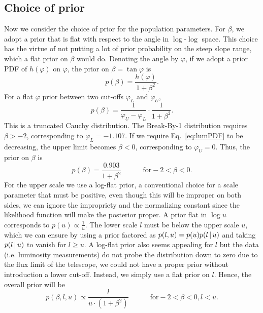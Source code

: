 \subsection{Choice of prior}

Now we consider the choice of prior for the population parameters.
For $\beta$, we adopt a prior that is flat with respect to the angle in $\log$-$\log$ space.
This choice has the virtue of not putting a lot of prior probability on the steep slope range, which a flat prior on $\beta$ would do.
Denoting the angle by $\varphi$, if we adopt a prior PDF of $h(\varphi)$ on $\varphi$, the prior on $\beta = \tan\varphi$ is
\begin{equation}
	p(\beta) = \frac{h(\varphi)}{1 + \beta^2}.
\end{equation}
For a flat $\varphi$ prior between two cut-offs $\varphi_L$ and $\varphi_U$,
\begin{equation}
	p(\beta) = \frac{1}{\varphi_U - \varphi_L} \cdot \frac{1}{1 + \beta^2}.
\end{equation}
This is a truncated Cauchy distribution.
The Break-By-1 distribution requires $\beta > -2$, corresponding to $\varphi_L = -1.107$.
If we require Eq.~\ref{eq:lumPDF} to be decreasing, the upper limit becomes $\beta < 0$, corresponding to $\varphi_U = 0$.
Thus, the prior on $\beta$ is
\begin{equation}
p(\beta) = \frac{0.903}{1 + \beta^2} \quad \quad \quad \textrm{for} -2 < \beta < 0.
\end{equation}
For the upper scale we use a log-flat prior, a conventional choice for a scale parameter that must be positive, even though this will be improper on both sides, we can ignore the impropriety and the normalizing constant since the likelihood function will make the posterior proper.
A prior flat in $\log{u}$ corresponds to $p(u) \propto \frac{1}{u}$.
The lower scale $l$ must be below the upper scale $u$, which we can ensure by using a prior factored as $p(l, u) = p(u) p(l \,|\, u)$ and taking $p(l \,|\, u)$ to vanish for $l \geq u$.
A log-flat prior also seems appealing for $l$ but the data (i.e. luminosity measurements) do not probe the distribution down to zero due to the flux limit of the telescope, we could not have a proper prior without introduction a lower cut-off.
Instead, we simply use a flat prior on $l$.
Hence, the overall prior will be \begin{equation}\label{eq:popParsPriorPDF} p(\beta, l, u) \propto \frac{l}{u \cdot (1 + \beta^2)} \quad\quad\quad \textrm{for} -2 < \beta < 0, l < u.
\end{equation}

